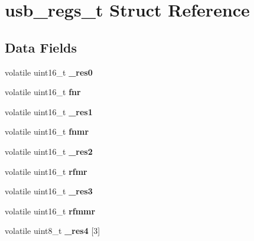 \hypertarget{structusb__regs__t}{}\section{usb\+\_\+regs\+\_\+t Struct Reference}
\label{structusb__regs__t}
\subsection*{Data Fields}
\begin{DoxyCompactItemize}
\item 
\mbox{\label{structusb__regs__t_a7d89aefa97c1eebb39973d17275066dc}} 
volatile uint16\+\_\+t {\bfseries \+\_\+res0}
\item 
\mbox{\label{structusb__regs__t_a46cf35788bfb6403e1d8e4f70ed89822}} 
volatile uint16\+\_\+t {\bfseries fnr}
\item 
\mbox{\label{structusb__regs__t_aba2071e2fe38db05a1356c5bfc1134a7}} 
volatile uint16\+\_\+t {\bfseries \+\_\+res1}
\item 
\mbox{\label{structusb__regs__t_a92798d4a00ed1e0ef54f5638d24e86ce}} 
volatile uint16\+\_\+t {\bfseries fnmr}
\item 
\mbox{\label{structusb__regs__t_abc6ce09fd92bd60e91ce89bdaae3c23b}} 
volatile uint16\+\_\+t {\bfseries \+\_\+res2}
\item 
\mbox{\label{structusb__regs__t_acdba0c61108472d79531720e002445ba}} 
volatile uint16\+\_\+t {\bfseries rfmr}
\item 
\mbox{\label{structusb__regs__t_a9cea7221ca95c3a78a4872fecdc54ab0}} 
volatile uint16\+\_\+t {\bfseries \+\_\+res3}
\item 
\mbox{\label{structusb__regs__t_a879382b87787da97ee6f195c22ecff3d}} 
volatile uint16\+\_\+t {\bfseries rfmmr}
\item 
\mbox{\label{structusb__regs__t_ae3f5edd41e6faaee33b34f7c01208382}} 
volatile uint8\+\_\+t {\bfseries \+\_\+res4} \mbox{[}3\mbox{]}

\end{DoxyCompactItemize}
